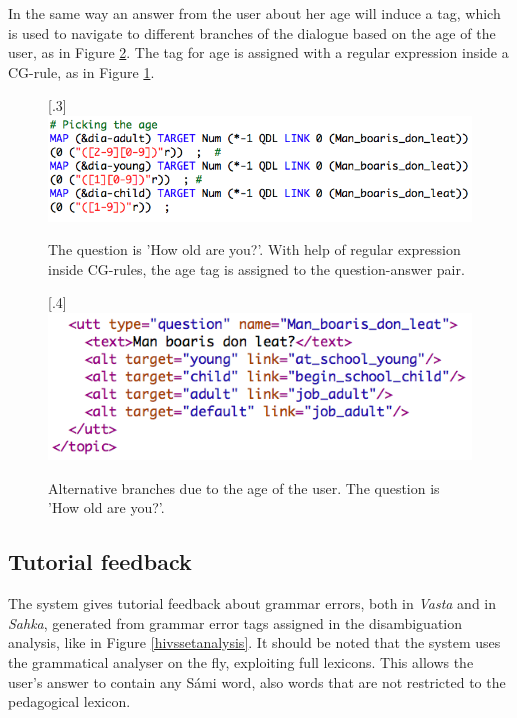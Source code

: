 \documentclass[11pt]{article}
\begin{document}
In the same way an answer from the user about her age will induce a tag, which is used to navigate to different branches of the dialogue based on the age of the user, as in Figure \ref{agebranches}. The tag for age is assigned with a regular expression inside a CG-rule, as in Figure \ref{agerule}.




\begin{figure}[htbp]
\begin{center}
\scalebox{.3}[.3]{\includegraphics{presentation/img/pickingage_colours.png}}\\
\caption{The question is 'How old are you?'. With help of regular expression inside CG-rules, the age tag is assigned to the question-answer pair.}
\label{agerule}
\end{center}
\end{figure}

\begin{figure}[htbp]
\begin{center}
\scalebox{.4}[.4]{\includegraphics{presentation/img/age_branching.png}}\\
\caption{Alternative branches due to the age of the user. The question is 'How old are you?'.}
\label{agebranches}
\end{center}
\end{figure}


\newpage

\subsection{Tutorial feedback} \label{tutorial}
The system gives tutorial feedback about grammar errors, both in \textit{Vasta} and in \textit{Sahka}, generated from grammar error tags assigned in the disambiguation analysis, like in Figure \ref{hivssetanalysis}. It should be noted that the system uses the grammatical analyser on the fly, exploiting full lexicons. This allows the user's answer to contain any Sámi word, also words that are not restricted to the pedagogical lexicon.
\end{document}
